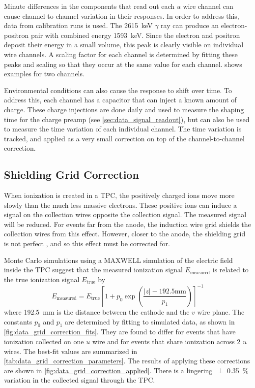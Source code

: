 \documentclass[herrin-thesis.tex]{subfiles}
\begin{document}
Minute differences in the components that read out each \(u\) wire channel can cause channel-to-channel variation in their responses. In order to address this, data from  calibration runs is used. The \SI{2615}{\keV} \(\gamma\) ray can produce an electron-positron pair with combined energy \SI{1593}{\keV}. Since the electron and positron deposit their energy in a small volume, this peak is clearly visible on individual wire channels. A scaling factor for each channel is determined by fitting these peaks and scaling so that they occur at the same value for each channel.  shows examples for two channels.

Environmental conditions can also cause the response to shift over time. To address this, each channel has a capacitor that can inject a known amount of charge. These charge injections are done daily and used to measure the shaping time for the charge preamp (see \cref{sec:data_signal_readout}), but can also be used to measure the time variation of each individual channel. The time variation is tracked, and applied as a very small correction on top of the channel-to-channel correction.

\subsection{Shielding Grid Correction}
\label{sec:data_grid_correction}
When ionization is created in a TPC, the positively charged ions move more slowly than the much less massive electrons. These positive ions can induce a signal on the collection wires opposite the collection signal. The measured signal will be reduced. For events far from the anode, the induction wire grid shields the collection wires from this effect. However, closer to the anode, the shielding grid is not perfect \cite{Bunemann:1949kx}, and so this effect must be corrected for.

Monte Carlo simulations using a MAXWELL simulation of the electric field inside the TPC suggest that the measured ionization signal \(E_\text{measured}\) is related to the true ionization signal \(E_\text{true}\) by
\begin{equation}
E_\text{measured} = E_\text{true}\left[1 + p_0 \exp \left(\frac{|z| - 192.5\si{\mm}}{p_1}\right)\right]^{-1}
\label{eq:data_grid_correction}
\end{equation}
where \SI{192.5}{\mm} is the distance between the cathode and the \(v\) wire plane. The constants \(p_0\) and \(p_1\) are determined by fitting to simulated data, as shown in \cref{fig:data_grid_correction_fits}. They are found to differ for events that have ionization collected on one \(u\) wire and for events that share ionization across 2 \(u\) wires. The best-fit values are summarized in \cref{tab:data_grid_correction_parameters}. The results of applying these corrections are shown in \cref{fig:data_grid_correction_applied}. There is a lingering \SI{\pm0.35}{\percent} variation in the collected signal through the TPC.
\end{document}
